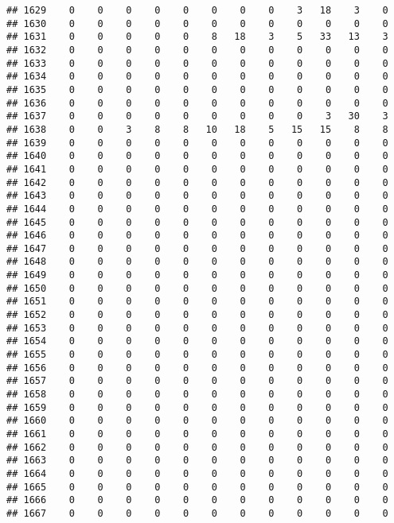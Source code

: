 \documentclass[]{article}
\begin{document}
\begin{verbatim}
## 1629    0    0    0    0    0    0    0    0    3   18    3    0
## 1630    0    0    0    0    0    0    0    0    0    0    0    0
## 1631    0    0    0    0    0    8   18    3    5   33   13    3
## 1632    0    0    0    0    0    0    0    0    0    0    0    0
## 1633    0    0    0    0    0    0    0    0    0    0    0    0
## 1634    0    0    0    0    0    0    0    0    0    0    0    0
## 1635    0    0    0    0    0    0    0    0    0    0    0    0
## 1636    0    0    0    0    0    0    0    0    0    0    0    0
## 1637    0    0    0    0    0    0    0    0    0    3   30    3
## 1638    0    0    3    8    8   10   18    5   15   15    8    8
## 1639    0    0    0    0    0    0    0    0    0    0    0    0
## 1640    0    0    0    0    0    0    0    0    0    0    0    0
## 1641    0    0    0    0    0    0    0    0    0    0    0    0
## 1642    0    0    0    0    0    0    0    0    0    0    0    0
## 1643    0    0    0    0    0    0    0    0    0    0    0    0
## 1644    0    0    0    0    0    0    0    0    0    0    0    0
## 1645    0    0    0    0    0    0    0    0    0    0    0    0
## 1646    0    0    0    0    0    0    0    0    0    0    0    0
## 1647    0    0    0    0    0    0    0    0    0    0    0    0
## 1648    0    0    0    0    0    0    0    0    0    0    0    0
## 1649    0    0    0    0    0    0    0    0    0    0    0    0
## 1650    0    0    0    0    0    0    0    0    0    0    0    0
## 1651    0    0    0    0    0    0    0    0    0    0    0    0
## 1652    0    0    0    0    0    0    0    0    0    0    0    0
## 1653    0    0    0    0    0    0    0    0    0    0    0    0
## 1654    0    0    0    0    0    0    0    0    0    0    0    0
## 1655    0    0    0    0    0    0    0    0    0    0    0    0
## 1656    0    0    0    0    0    0    0    0    0    0    0    0
## 1657    0    0    0    0    0    0    0    0    0    0    0    0
## 1658    0    0    0    0    0    0    0    0    0    0    0    0
## 1659    0    0    0    0    0    0    0    0    0    0    0    0
## 1660    0    0    0    0    0    0    0    0    0    0    0    0
## 1661    0    0    0    0    0    0    0    0    0    0    0    0
## 1662    0    0    0    0    0    0    0    0    0    0    0    0
## 1663    0    0    0    0    0    0    0    0    0    0    0    0
## 1664    0    0    0    0    0    0    0    0    0    0    0    0
## 1665    0    0    0    0    0    0    0    0    0    0    0    0
## 1666    0    0    0    0    0    0    0    0    0    0    0    0
## 1667    0    0    0    0    0    0    0    0    0    0    0    0

\end{verbatim}
\end{document}
